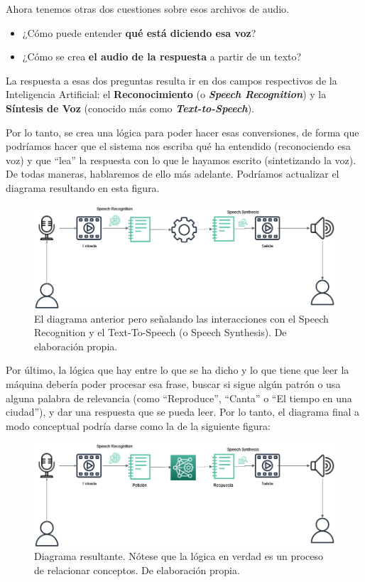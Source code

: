 Ahora tenemos otras dos cuestiones sobre esos archivos de audio.
\begin{itemize}
	\item ¿Cómo puede entender \textbf{qué está diciendo esa voz}?
	\item ¿Cómo se crea \textbf{el audio de la respuesta} a partir de un texto?
\end{itemize}
La respuesta a esas dos preguntas resulta ir en dos campos respectivos de la Inteligencia Artificial: el \textbf{Reconocimiento} (o \textit{\textbf{Speech Recognition}}) y la \textbf{Síntesis de Voz} (conocido más como \textbf{\textit{Text-to-Speech}}). 

Por lo tanto, se crea una lógica para poder hacer esas conversiones, de forma que podríamos hacer que el sistema nos escriba qué ha entendido (reconociendo esa voz) y que ``lea'' la respuesta con lo que le hayamos escrito (sintetizando la voz). De todas maneras, hablaremos de ello más adelante. Podríamos actualizar el diagrama resultando en esta figura.

\begin{figure}[H]
	\centering
	\includegraphics[width=1.1\textwidth]{imagenes/DiagramaTTS_SR.png}
	\caption[Diagrama con TTS/SR]{El diagrama anterior pero señalando las interacciones con el Speech Recognition y el Text-To-Speech (o Speech Synthesis). De elaboración propia.}
\end{figure}

Por último, la lógica que hay entre lo que se ha dicho y lo que tiene que leer la máquina debería poder procesar esa frase, buscar si sigue algún patrón o usa alguna palabra de relevancia (como ``Reproduce'', ``Canta'' o ``El tiempo en una ciudad''), y dar una respuesta que se pueda leer. Por lo tanto, el diagrama final a modo conceptual podría darse como la de la siguiente figura: 

\begin{figure}[H]
	\centering
	\includegraphics[width=1.1\textwidth]{imagenes/DiagramaIntuitivo.png}
	\caption[Diagrama intuitivo final.]{Diagrama resultante. Nótese que la lógica en verdad es un proceso de relacionar conceptos. De elaboración propia.}
\end{figure}

